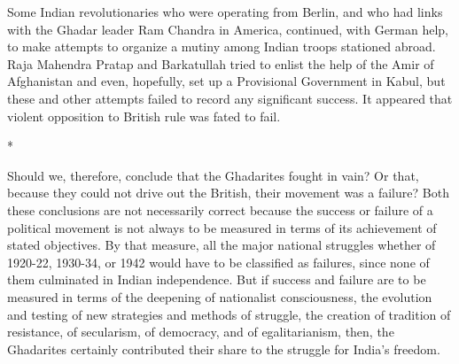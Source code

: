 Some Indian revolutionaries who were operating from Berlin, and who had links with the Ghadar leader Ram Chandra in America, continued, with German help, to make attempts to organize a mutiny among Indian troops stationed abroad. Raja Mahendra Pratap and Barkatullah tried to enlist the help of the Amir of Afghanistan and even, hopefully, set up a Provisional Government in Kabul, but these and other attempts failed to record any significant success. It appeared that violent opposition to British rule was fated to fail.

\begin{center}*\end{center}



Should we, therefore, conclude that the Ghadarites fought in vain? Or that, because they could not drive out the British, their movement was a failure? Both these conclusions are not necessarily correct because the success or failure of a political movement is not always to be measured in terms of its achievement of stated objectives. By that measure, all the major national struggles whether of 1920-22, 1930-34, or 1942 would have to be classified as failures, since none of them culminated in Indian independence. But if success and failure are to be measured in terms of the deepening of nationalist consciousness, the evolution and testing of new strategies and methods of struggle, the creation of tradition of resistance, of secularism, of democracy, and of egalitarianism, then, the Ghadarites certainly contributed their share to the struggle for India’s freedom.

